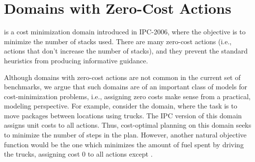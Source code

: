 \section{Domains with Zero-Cost Actions}
\label{sec:zerocost-domains}
  is a cost
minimization domain introduced in IPC-2006, where the objective is to 
minimize the number of stacks used.
There are many zero-cost actions (i.e., actions that don't increase the number of stacks), and
they prevent the standard heuristics from producing
informative guidance.




Although domains with zero-cost actions are not common in the current set of benchmarks, we argue that such domains are of an important class of models for cost-minimization problems, i.e.,
assigning zero costs make sense from a practical, modeling perspective.
For example, consider the  domain, where the task is to move packages between locations using trucks.
The IPC version of this domain assigns unit costs to all actions. Thus, cost-optimal planning on this domain seeks to minimize the number of steps in the plan.
However, another natural objective function would be the one which minimizes the amount of fuel spent by driving the trucks,
assigning cost 0 to all actions except .

